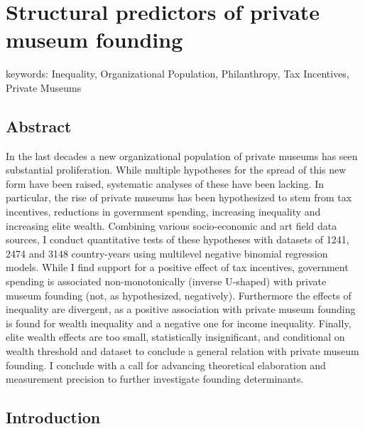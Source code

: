 \documentclass[11pt, authoryear]{elsarticle}
\author{Johannes }
\date{\today}
\title{}
\begin{document}
\section*{Structural predictors of private museum founding}

\noindent
keywords: Inequality, Organizational Population, Philanthropy, Tax Incentives, Private Museums  

\subsection*{Abstract}

In the last decades a new organizational population of private museums has seen substantial proliferation.
While multiple hypotheses for the spread of this new form have been raised, systematic analyses of these have been lacking.
In particular, the rise of private museums has been hypothesized to stem from tax incentives, reductions in government spending, increasing inequality and increasing elite wealth. 
Combining various socio-economic and art field data sources, I conduct quantitative tests of these hypotheses with datasets of 1241, 2474 and 3148 country-years using multilevel negative binomial regression models.
While I find support for a positive effect of tax incentives, government spending is associated non-monotonically (inverse U-shaped) with private museum founding (not, as hypothesized, negatively). 
Furthermore the effects of inequality are divergent, as a positive association with private museum founding is found for wealth inequality and a negative one for income inequality.
Finally, elite wealth effects are too small, statistically insignificant, and conditional on wealth threshold and dataset to conclude a general relation with private museum founding.
I conclude with a call for advancing theoretical elaboration and measurement precision to further investigate founding determinants. 





\subsection*{Introduction}
\end{document}

